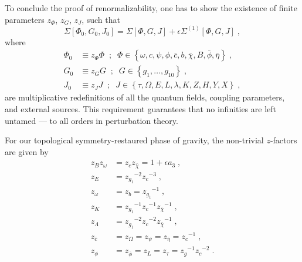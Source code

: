 \documentclass[../main.tex]{subfiles}
\begin{document}
To conclude the proof of renormalizability, one has to show the existence of finite parameters $ z_{ \Phi } $, $ z_{ G } $, $ z_{ J } $, such that
\begin{equation}
  \label{eq:multiplicative-renorm}
  \Sigma \left[ \Phi_0, G_0, J_0 \right] = \Sigma \left[ \Phi, G, J \right] + \epsilon\Sigma^{ (1) } \left[ \Phi, G, J \right] \;,
\end{equation}
where
\begin{subequations}%
  \label{eq:field-redef}
  \begin{align}
    \Phi_0 & \equiv z_{ \Phi } \Phi \;\; ; \;\; \Phi \in \left\{ \omega, c, \psi, \phi, \bar{ c }, b, \bar{ \chi }, B, \bar{ \phi }, \bar{ \eta } \right\} \;, \\
    G_0    & \equiv z_{ G } G \;\; ; \;\; G \in \left\{ g_1, \ldots, g_{10} \right\} \;,                                                                       \\
    J_0    & \equiv z_{ J } J \;\; ; \;\; J \in \left\{ \tau, \Omega, E, L, \lambda, K, Z, H, Y, X \right\} \;,
  \end{align}
\end{subequations}
are multiplicative redefinitions of all the quantum fields, coupling parameters, and external sources. This requirement guarantees that no infinities are left untamed --- to all orders in perturbation theory.

For our topological symmetry-restaured phase of gravity, the non-trivial $z$-factors are given by
\begin{subequations}%
  \label{eq:z-factors}
  \begin{align}
    z_B z_{ \omega } & = z_c z_{\bar{\chi}} = 1 + \epsilon a_3 \;,                \\
    z_E              & = {z_{g_1}}^{-2} {z_c}^{-3} \;,                            \\
    z_{ \omega }     & = z_b = {z_{g_1}}^{-1} \;,                                 \\
    z_K              & = {z_{ g_1 }}^{-1} {z_c}^{-1} {z_{\bar{\chi}}}^{-1} \;,    \\
    z_\Lambda        & = {z_{ g_1 }}^{-2} {z_c}^{-2} {z_{\bar{\chi}}}^{-1} \;,    \\
    z_{\bar{c}}      & = z_\Omega = z_\psi = z_{\bar\eta} = {z_c}^{-1} \;,        \\
    z_\phi           & = z_{\bar{\phi}} = z_L = z_\tau = {z_g}^{-1} {z_c}^{-2}\;.
  \end{align}
\end{subequations}
\end{document}

